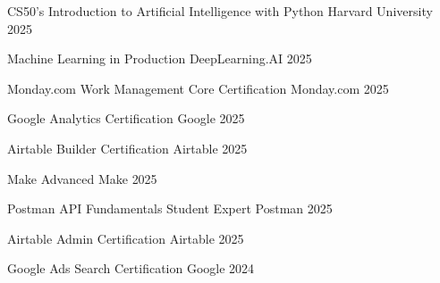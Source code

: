 

\begin{cvhonors}
  \cvhonor
    {CS50's Introduction to Artificial Intelligence with Python} %
    {Harvard University} %
    {} %
    {2025} %

  \cvhonor
    {Machine Learning in Production} %
    {DeepLearning.AI} %
    {} %
    {2025} %

  \cvhonor
    {Monday.com Work Management Core Certification} %
    {Monday.com} %
    {} %
    {2025} %

  \cvhonor
    {Google Analytics Certification} %
    {Google} %
    {} %
    {2025} %

  \cvhonor
    {Airtable Builder Certification} %
    {Airtable} %
    {} %
    {2025} %

  \cvhonor
    {Make Advanced} %
    {Make} %
    {} %
    {2025} %

  \cvhonor
    {Postman API Fundamentals Student Expert} %
    {Postman} %
    {} %
    {2025} %

  \cvhonor
    {Airtable Admin Certification} %
    {Airtable} %
    {} %
    {2025} %

  \cvhonor
    {Google Ads Search Certification} %
    {Google} %
    {} %
    {2024} %
\end{cvhonors}

